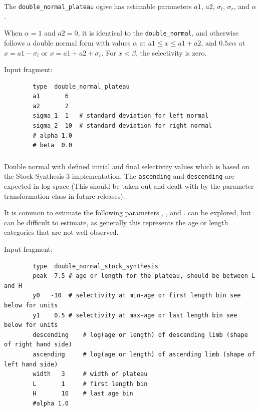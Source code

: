 The \texttt{double\_normal\_plateau} ogive has estimable parameters \(a1\), \(a2\), \(\sigma_l\), \(\sigma_r\), and \(\alpha\). 

When \(\alpha = 1\) and \(a2 = 0\), it is identical to the \texttt{double\_normal}, and otherwise follows a double normal form with values \(\alpha\) at \(a1 \le x \leq a1+a2\), and \(0.5 x \alpha\) at \(x= a1-\sigma_l\) or \(x=a1+a2+\sigma_r\). For $x < \beta$, the selectivity is zero.

Input fragment: {\small{\begin{verbatim}
		type  double_normal_plateau
		a1       6    
		a2 	     2
		sigma_1  1   # standard deviation for left normal
		sigma_2  10  # standard deviation for right normal
		# alpha 1.0
		# beta  0.0
		\end{verbatim}}}

\subsubsection[Double-normal-stocksynthesis]{}\label{sec:Selectivity-DoubleNormalStockSynthesis}

Double normal with defined initial and final selectivity values which is based on the Stock Synthesis 3 implementation. The \texttt{ascending} and \texttt{descending} are expected in log space (This should be taken out and dealt with by the parameter transformation class in future releases).

It is common to estimate the following parameters , ,  and .  can be explored, but can be difficult to estimate, as generally this represents the age or length categories that are not well observed.

Input fragment: {\small{\begin{verbatim}
		type  double_normal_stock_synthesis
		peak  7.5 # age or length for the plateau, should be between L and H
		y0	 -10  # selectivity at min-age or first length bin see below for units
		y1	  0.5 # selectivity at max-age or last length bin see below for units
		descending 	  # log(age or length) of descending limb (shape of right hand side) 
		ascending 	  # log(age or length) of ascending limb (shape of left hand side) 
		width   3     # width of plateau
		L  		1     # first length bin
		H 		10    # last age bin
		#alpha 1.0
		\end{verbatim}}}

